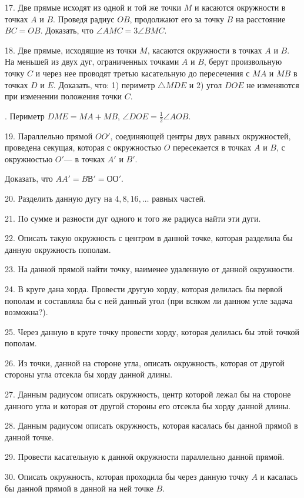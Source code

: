 \documentclass[oneside]{book}
\begin{document}
17.
Две прямые исходят из одной и той же точки $M$ и касаются окружности в точках $A$ и $B$.
Проведя радиус $OB$, продолжают его за точку $B$ на расстояние $BC=OB$.
Доказать, что $\angle AMC=3\angle BMC$.

18.
Две прямые, исходящие из точки $M$, касаются окружности в точках $A$ и $B$.
На меньшей из двух дуг, ограниченных точками $A$ и $B$, берут произвольную точку $C$ и через нее проводят третью касательную до пересечения с $MA$ и $MB$ в точках $D$ и $E$.
Доказать, что:
1) периметр $\triangle MDE$ и 2) угол $DOE$ не изменяются при изменении положения точки $C$.

.
Периметр $DME=MA+MB$, $\angle DOE=\tfrac12 \angle AOB$.

19.
Параллельно прямой $OO'$, соединяющей центры двух равных окружностей, проведена секущая, которая с окружностью $O$ пересекается в точках $A$ и $B$, с окружностью $O'$— в точках $A'$ и $B'$.

Доказать, что $AA' = BВ' = ОО'$.


20.
Разделить данную дугу на $4, 8, 16, \dots$
равных частей.

21.
По сумме и разности дуг одного и того же радиуса найти эти дуги.

22.
Описать такую окружность с центром в данной точке, которая разделила бы данную окружность пополам.

23.
На данной прямой найти точку, наименее удаленную от данной окружности.

24.
В круге дана хорда.
Провести другую хорду, которая делилась бы первой пополам и составляла бы с ней данный угол (при всяком ли данном угле задача возможна?).

25.
Через данную в круге точку провести хорду, которая делилась бы этой точкой пополам.

26.
Из точки, данной на стороне угла, описать окружность, которая от другой стороны угла отсекла бы хорду данной длины.

27.
Данным радиусом описать окружность, центр которой лежал бы на стороне данного угла и которая от другой стороны его отсекла бы хорду данной длины.

28.
Данным радиусом описать окружность, которая касалась бы данной прямой в данной точке.

29.
Провести касательную к данной окружности параллельно данной прямой.

30.
Описать окружность, которая проходила бы через данную точку $A$ и касалась бы данной прямой в данной на ней точке $B$.
\end{document}
